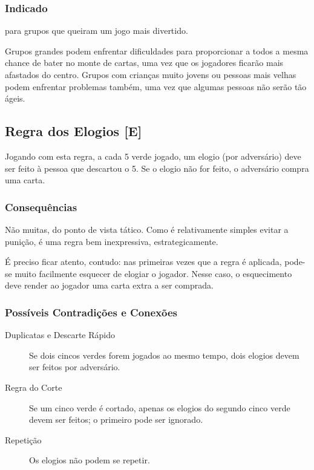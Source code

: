 \subsubsection{Indicado} 

para grupos que queiram um jogo mais divertido.

Grupos grandes podem enfrentar dificuldades para proporcionar a todos a mesma chance de bater no monte de cartas, uma vez que os jogadores ficarão mais afastados do centro. Grupos com crianças muito jovens ou pessoas mais velhas podem enfrentar problemas também, uma vez que algumas pessoas não serão tão ágeis.

\subsection{Regra dos Elogios [E]}

\label{elogios}

Jogando com esta regra, a cada 5 verde jogado, um elogio (por adversário) deve ser feito à pessoa que descartou o 5. Se o elogio não for feito, o adversário compra uma carta.

\subsubsection{Consequências}

Não muitas, do ponto de vista tático. Como é relativamente simples evitar a punição, é uma regra bem inexpressiva, estrategicamente.

É preciso ficar atento, contudo: nas primeiras vezes que a regra é aplicada, pode-se muito facilmente esquecer de elogiar o jogador. Nesse caso, o esquecimento deve render ao jogador uma carta extra a ser comprada.

\subsubsection{Possíveis Contradições e Conexões}

\begin{description}
\item[Duplicatas e Descarte Rápido]{Se dois cincos verdes forem jogados ao mesmo tempo, dois elogios devem ser feitos por adversário.}
\item[Regra do Corte]{Se um cinco verde é cortado, apenas os elogios do segundo cinco verde devem ser feitos; o primeiro pode ser ignorado.}
\item[Repetição]{Os elogios não podem se repetir.}
\end{description}

